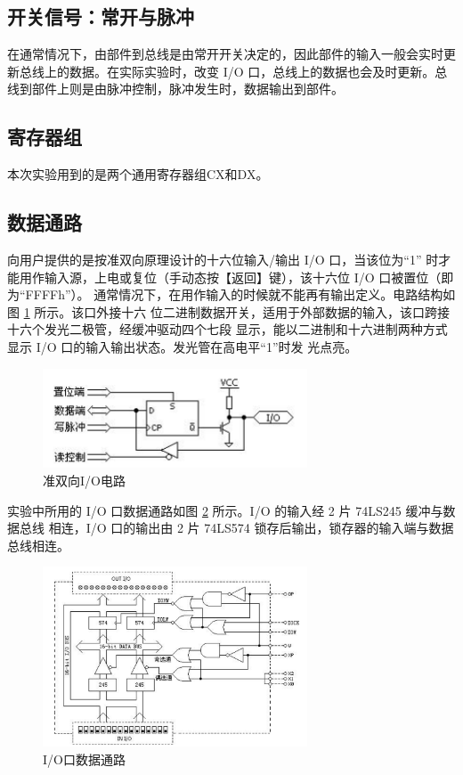 \documentclass[a4paper,10pt,UTF8]{paper}
\numberwithin{equation}{section}
\numberwithin{figure}{section}
\begin{document}
\subsection{开关信号：常开与脉冲}

在通常情况下，由部件到总线是由常开开关决定的，因此部件的输入一般会实时更新总线上的数据。在实际实验时，改变 I/O 口，总线上的数据也会及时更新。总线到部件上则是由脉冲控制，脉冲发生时，数据输出到部件。

\subsection{寄存器组}

本次实验用到的是两个通用寄存器组CX和DX。

\subsection{数据通路}

\dai 向用户提供的是按准双向原理设计的十六位输入/输出 I/O 口，当该位为“1”
时才能用作输入源，上电或复位（手动态按【返回】键），该十六位 I/O 口被置位（即为“FFFFh”）。
通常情况下，在用作输入的时候就不能再有输出定义。电路结构如图 \ref{fig:io} 所示。该口外接十六
位二进制数据开关，适用于外部数据的输入，该口跨接十六个发光二极管，经缓冲驱动四个七段
显示，能以二进制和十六进制两种方式显示 I/O 口的输入输出状态。发光管在高电平“1”时发
光点亮。

\begin{figure}[h]
    \centering
    \includegraphics[width=0.7\textwidth]{io.PNG}
    \caption{准双向I/O电路}
    \label{fig:io}
\end{figure}{}

实验中所用的 I/O 口数据通路如图 \ref{fig:circuit} 所示。I/O 的输入经 2 片 74LS245 缓冲与数据总线
相连，I/O 口的输出由 2 片 74LS574 锁存后输出，锁存器的输入端与数据总线相连。

\begin{figure}[h]
    \centering
    \includegraphics[width=0.7\textwidth]{circuit.PNG}
    \caption{I/O口数据通路}
    \label{fig:circuit}
\end{figure}{}
\end{document}
